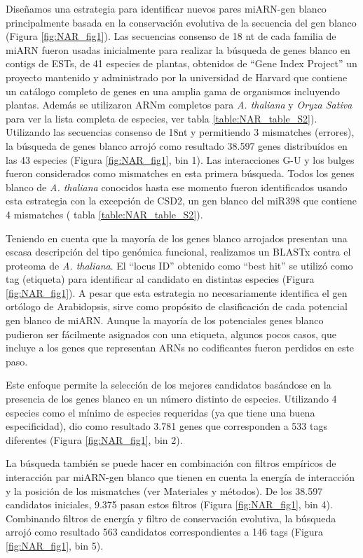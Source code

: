 Diseñamos una estrategia para identificar nuevos pares miARN-gen blanco principalmente basada en la conservación evolutiva de la secuencia del gen blanco (Figura \ref{fig:NAR_fig1}).
Las secuencias consenso de 18 nt de cada familia de miARN fueron usadas inicialmente para realizar la búsqueda de genes blanco en contigs de ESTs, de 41 especies de plantas, obtenidos de “Gene Index Project” un proyecto mantenido y administrado por la universidad de Harvard que contiene un catálogo completo de genes en una amplia gama de organismos incluyendo plantas.
Además se utilizaron ARNm completos para \textit{A. thaliana} y \textit{Oryza Sativa} para ver la lista completa de especies, ver tabla \ref{table:NAR_table_S2}).
Utilizando las secuencias consenso de 18nt y permitiendo 3 mismatches (errores), la búsqueda de genes blanco arrojó como resultado 38.597 genes distribuídos en las 43 especies (Figura \ref{fig:NAR_fig1}, bin 1).
Las interacciones G-U y los bulges fueron considerados como mismatches en esta primera búsqueda. Todos los genes blanco de  \textit{A. thaliana} conocidos hasta ese momento fueron identificados usando esta estrategia con la excepción de CSD2, un gen blanco del miR398 que contiene 4 mismatches ( tabla \ref{table:NAR_table_S2}).

Teniendo en cuenta que la mayoría de los genes blanco arrojados presentan una escasa descripción del tipo genómica funcional, realizamos un BLASTx  contra el proteoma de \textit{A. thaliana}.
El “locus ID” obtenido como “best hit” se utilizó como tag (etiqueta) para identificar al candidato en distintas especies (Figura \ref{fig:NAR_fig1}).
A pesar que esta estrategia no necesariamente identifica el gen ortólogo de Arabidopsis, sirve como propósito de clasificación de cada potencial gen blanco de miARN.
Aunque la mayoría de los potenciales genes blanco pudieron ser fácilmente asignados con una etiqueta, algunos pocos casos, que incluye a los genes que representan ARNs no codificantes fueron perdidos en este paso.

Este enfoque permite la selección de los mejores candidatos basándose en la presencia de los genes blanco en un número distinto de especies.
Utilizando 4 especies como el mínimo de especies requeridas (ya que tiene una buena especificidad), dio como resultado 3.781 genes que corresponden a 533 tags diferentes (Figura \ref{fig:NAR_fig1}, bin 2).

La búsqueda también se puede hacer en combinación con filtros empíricos de interacción par miARN-gen blanco que tienen en cuenta la energía de interacción y la posición de los mismatches (ver Materiales y métodos).
De los 38.597 candidatos iniciales, 9.375 pasan estos filtros (Figura \ref{fig:NAR_fig1}, bin 4).
Combinando filtros de energía y filtro de conservación evolutiva, la búsqueda arrojó como resultado 563 candidatos correspondientes a 146 tags (Figura \ref{fig:NAR_fig1}, bin 5).


